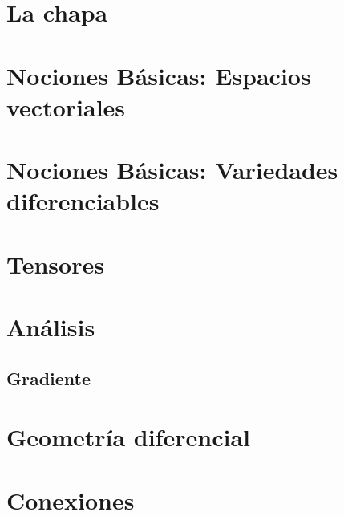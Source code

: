 \documentclass[11pt,fleqn]{book}
\begin{document}
  \printglossaries


  \chapter{La chapa}\label{ch:la-chapa}
  


  \chapter{Nociones Básicas: Espacios vectoriales}\label{ch:basico-espacio-vectorial}
  

  \chapter{Nociones Básicas: Variedades diferenciables}\label{ch:basico-variedad-diferencial}
  

  \chapter{Tensores}\label{ch:tensores}
  


  \chapter{Análisis}\label{ch:analisis}


  \section{Gradiente}\label{sec:gradiente}
  


  \chapter{Geometría diferencial}\label{ch:geometria-diferencial}
  


  \chapter{Conexiones}\label{ch:conexiones}
  

  
  
\end{document}
